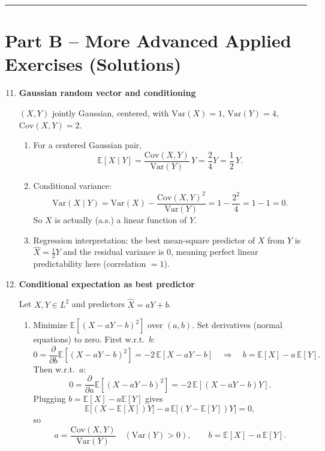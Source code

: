 \documentclass[11pt]{article}
\begin{document}
\bigskip
\hrule
\bigskip

\section*{Part B -- More Advanced Applied Exercises (Solutions)}

\begin{enumerate}
\setcounter{enumi}{10}

\item \textbf{Gaussian random vector and conditioning}

$(X,Y)$ jointly Gaussian, centered, with $\mathrm{Var}(X)=1$, $\mathrm{Var}(Y)=4$, $\mathrm{Cov}(X,Y)=2$.

\begin{enumerate}
\item For a centered Gaussian pair,
\[
\mathbb{E}[X\mid Y]=\frac{\mathrm{Cov}(X,Y)}{\mathrm{Var}(Y)}\,Y=\frac{2}{4}Y=\frac12\,Y.
\]

\item Conditional variance:
\[
\mathrm{Var}(X\mid Y)=\mathrm{Var}(X)-\frac{\mathrm{Cov}(X,Y)^2}{\mathrm{Var}(Y)}
=1-\frac{2^2}{4}=1-1=0.
\]
So $X$ is actually (a.s.) a linear function of $Y$.

\item Regression interpretation:
the best mean-square predictor of $X$ from $Y$ is $\widehat X=\frac12 Y$ and the residual variance is $0$,
meaning perfect linear predictability here (correlation $=1$).
\end{enumerate}

\bigskip

\item \textbf{Conditional expectation as best predictor}

Let $X,Y\in L^2$ and predictors $\hat X=aY+b$.

\begin{enumerate}
\item Minimize $\mathbb{E}[(X-aY-b)^2]$ over $(a,b)$.
Set derivatives (normal equations) to zero. First w.r.t.\ $b$:
\[
0=\frac{\partial}{\partial b}\mathbb{E}[(X-aY-b)^2]
=-2\,\mathbb{E}[X-aY-b]
\quad\Rightarrow\quad
b=\mathbb{E}[X]-a\,\mathbb{E}[Y].
\]
Then w.r.t.\ $a$:
\[
0=\frac{\partial}{\partial a}\mathbb{E}[(X-aY-b)^2]
=-2\,\mathbb{E}[(X-aY-b)Y].
\]
Plugging $b=\mathbb{E}[X]-a\mathbb{E}[Y]$ gives
\[
\mathbb{E}\!\big[(X-\mathbb{E}[X])Y\big]-a\,\mathbb{E}\!\big[(Y-\mathbb{E}[Y])Y\big]=0,
\]
so
\[
a=\frac{\mathrm{Cov}(X,Y)}{\mathrm{Var}(Y)}\quad (\mathrm{Var}(Y)>0),
\qquad
b=\mathbb{E}[X]-a\,\mathbb{E}[Y].
\]


\end{enumerate}
\end{enumerate}
\end{document}
